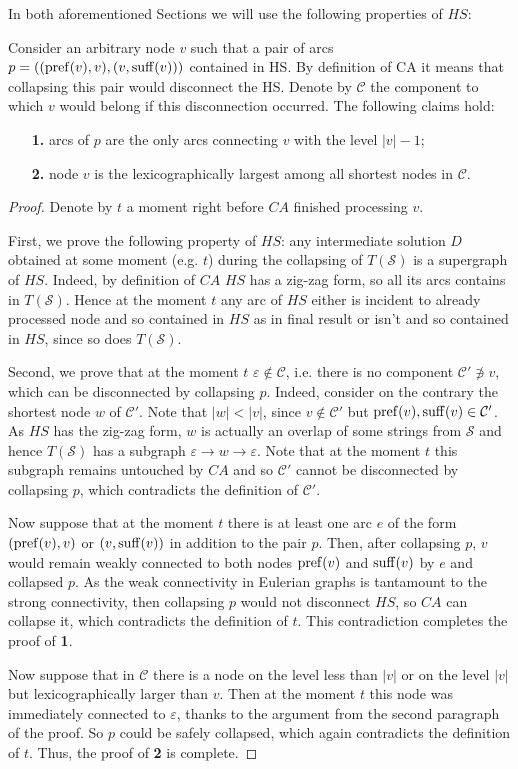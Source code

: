 In both aforementioned Sections we will use the following properties of $HS$:
\begin{lemma}\label{lemma:property}
    Consider an arbitrary node $v$ such that a pair of arcs $p = ((\operatorname{pref}(v), v), (v, \operatorname{suff}(v)))$ contained in HS. By definition of CA it means that collapsing this pair would disconnect the HS. Denote by $\mathcal{C}$ the component to which $v$ would belong if this disconnection occurred. The following claims hold:
    \begin{itemize}
        \item[\bf 1.] arcs of $p$ are the only arcs connecting $v$ with the level $|v|-1$;
        \item[\bf 2.] node $v$ is the lexicographically largest among all shortest nodes in $\mathcal{C}$.
    \end{itemize}    
\end{lemma}
\begin{proof}
    Denote by $t$ a moment right before $CA$ finished processing $v$.
    
    First, we prove the following property of $HS$: any intermediate solution $D$ obtained at some moment (e.g. $t$) during the collapsing of $T(\mathcal{S})$ is a supergraph of $HS$. Indeed, by definition of $CA$ $HS$ has a zig-zag form, so all its arcs contains in $T(\mathcal{S})$. Hence at the moment $t$ any arc of $HS$ either is incident to already processed node and so contained in $HS$ as in final result or isn't and so contained in $HS$, since so does $T(\mathcal{S})$.
    
    Second, we prove that at the moment $t$ $\varepsilon \notin \mathcal{C}$, i.e. there is no component $\mathcal{C}' \not\ni v$, which can be disconnected by collapsing $p$. Indeed, consider on the contrary the shortest node $w$ of $\mathcal{C}'$. Note that $|w| < |v|$, since $v \notin \mathcal{C}'$ but $\operatorname{pref}(v), \operatorname{suff}(v) \in \mathcal{C}'$. As $HS$ has the zig-zag form, $w$ is actually an overlap of some strings from $\mathcal{S}$ and hence $T(\mathcal{S})$ has a subgraph $\varepsilon \to w \to \varepsilon$. Note that at the moment $t$ this subgraph remains untouched by $CA$ and so $\mathcal{C}'$ cannot be disconnected by collapsing $p$, which contradicts the definition of $\mathcal{C}'$.
    
    Now suppose that at the moment $t$ there is at least one arc $e$ of the form $(\operatorname{pref}(v), v)$ or $(v, \operatorname{suff}(v))$ in addition to the pair $p$. Then, after collapsing $p$, $v$ would remain weakly connected to both nodes $\operatorname{pref}(v)$ and $\operatorname{suff}(v)$ by $e$ and collapsed $p$. As the weak connectivity in Eulerian graphs is tantamount to the strong connectivity, then collapsing $p$ would not disconnect $HS$, so $CA$ can collapse it, which contradicts the definition of $t$. This contradiction completes the proof of {\bf 1}.
    
    Now suppose that in $\mathcal{C}$ there is a node on the level less than $|v|$ or on the level $|v|$ but lexicographically larger than $v$. Then at the moment $t$ this node was immediately connected to $\varepsilon$, thanks to the argument from the second paragraph of the proof. So $p$ could be safely collapsed, which again contradicts the definition of $t$. Thus, the proof of {\bf 2} is complete.
\end{proof}
